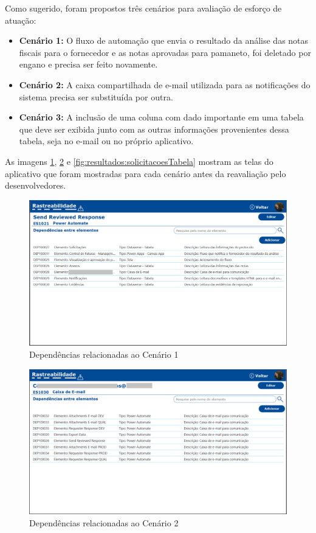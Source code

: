 	Como sugerido, foram propostos três cenários para avaliação de esforço de atuação:

	\begin{itemize}
		\item \textbf{Cenário 1:} O fluxo de automação que envia o resultado da análise das notas fiscais para o fornecedor e as notas aprovadas para {\color{red} pamaneto},
		foi deletado por engano e precisa ser feito novamente.
		\item \textbf{Cenário 2:} A caixa compartilhada de e-mail utilizada para as notificações do sistema precisa ser substituída por outra.
		\item \textbf{Cenário 3:} A inclusão de uma coluna com dado importante em uma tabela que deve ser exibida junto com as outras informações provenientes dessa tabela, seja no e-mail ou no próprio aplicativo.
	\end{itemize}

	As imagens \ref{fig:resultados:sendReviewedResponse}, \ref{fig:resultados:caixadeEmail} e \ref{fig:resultados:solicitacoesTabela} mostram as telas do aplicativo
	que foram mostradas para cada cenário antes da reavaliação pelo desenvolvedores.

	\begin{figure}[!h]
		\centering
		\includegraphics[width=1\textwidth]{./figuras/sendReviewedResponse.png}
		\caption{Dependências relacionadas ao Cenário 1}
		\label{fig:resultados:sendReviewedResponse}
	\end{figure}

	\begin{figure}[!h]
		\centering
		\includegraphics[width=1\textwidth]{./figuras/caixadeEmail.png}
		\caption{Dependências relacionadas ao Cenário 2}
		\label{fig:resultados:caixadeEmail}
	\end{figure}

